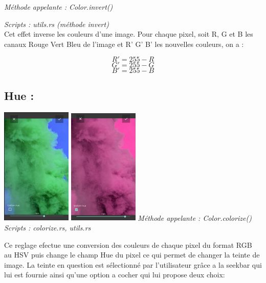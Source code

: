 \emph{Méthode appelante : Color.invert()}

\emph{Scripts : utils.rs (méthode invert)} 
\\

Cet effet inverse les couleurs d'une image. Pour chaque pixel, soit R, G et B les canaux Rouge Vert Bleu de l'image et R' G' B' les nouvelles couleurs, on a :

\[            
    R' =  255 - R
\] 
\[            
    G' =  255 - G
\]  
\[            
    B' =  255 - B
\] 


\subsection{Hue :}

    \includegraphics[width=0.25\textwidth]{report_src/effects/non-uniform-hue.png}
    \includegraphics[width=0.25\textwidth]{report_src/effects/uniform-hue.png}
    \newline
    \emph{Méthode appelante : Color.colorize()}
    \emph{Scripts : colorize.rs, utils.rs} 
    \newline

    Ce reglage efectue une conversion des couleurs de chaque pixel du format RGB au HSV puis change le champ Hue du pixel ce qui permet de 
    changer la teinte de image.
    La teinte en question est sélectionné par l'utilisateur grâce a la seekbar qui lui est fournie ainsi qu'une option a cocher qui lui propose deux choix:
    \\

